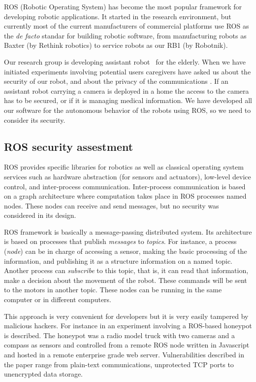 \documentclass[journal,twoside]{JoPhA}
\begin{document}
ROS (Robotic Operating System) \cite{ROS09} has become the most popular framework for developing robotic applications. It started in the research environment, but currently most of the current manufacturers of commercial platforms use ROS as the {\em de facto} standar for building robotic software, from manufacturing robots as Baxter (by Rethink robotics) to service robots as our RB1 (by Robotnik).

Our research group is developing assistant robot~\cite{Martin2014} for the elderly. When we have initiated experiments involving potential users caregivers have asked us about the security of our robot, and about the privacy of the communications \cite{Denning2009}. If an assistant robot carrying a camera is deployed in a home the access to the camera has to be secured, or if it is managing medical information. We have developed all our software for the autonomous behavior of the robots using ROS, so we need to consider its security.


\subsection{ROS security assestment}

ROS provides specific libraries for robotics as well as classical operating system services such as hardware abstraction (for sensors and actuators), low-level device control, and inter-process communication. Inter-process communication is based on a graph architecture where computation takes place in ROS processes named nodes. These nodes can receive and send messages, but no security was considered in its design. 

ROS framework is basically a message-passing distributed system. Its architecture is based on processes that publish {\em messages} to {\em topics}. For instance, a process ({\em node}) can be in charge of accessing a sensor, making the basic processing of the information, and publishing it as a structure information on a named topic. Another process can {\em subscribe} to this topic, that is, it can read that information, make a decision about the movement of the robot. These commands will be sent to the motors in another topic. These nodes can be running in the same computer or in different computers. 

This approach is very convenient for developers but it is very easily tampered by malicious hackers. For instance in \cite{McClean2013} an experiment involving a ROS-based honeypot is described. The honeypot was a radio model truck with two cameras and a compass as sensors and controlled from a remote ROS node written in Javascript and hosted in a remote enterprise grade web server. Vulnerabilities described in the paper range from plain-text communications, unprotected TCP ports to unencrypted data storage.
\end{document}
